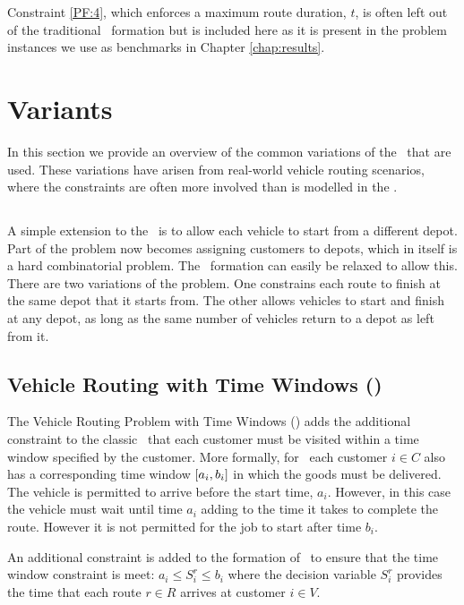 Constraint \eqref{PF:4}, which enforces a maximum route duration, $t$, is often left out of the traditional \CVRP\ formation but is included here as it is present in the problem instances we use as benchmarks in Chapter \ref{chap:results}.

\section{Variants}
\label{sec:variants}

In this section we provide an overview of the common variations of the \VRP\ that are used. These variations have arisen from real-world vehicle routing scenarios, where the constraints are often more involved than is modelled in the \CVRP. 

\subsection{\MDVRP}

A simple extension to the \CVRP\ is to allow each vehicle to start from a different depot. Part of the problem now becomes assigning customers to depots, which in itself is a hard combinatorial problem. The \CVRP\ formation can easily be relaxed to allow this. There are two variations of the problem. One constrains each route to finish at the same depot that it starts from. The other allows vehicles to start and finish at any depot, as long as the same number of vehicles return to a depot as left from it.

\subsection{Vehicle Routing with Time Windows (\VRPTW)}

The Vehicle Routing Problem with Time Windows (\VRPTW) adds the additional constraint to the classic \VRP\ that each customer must be visited within a time window specified by the customer. More formally, for \VRPTW\ each customer $i \in C$ also has a corresponding time window $[a_i, b_i]$ in which the goods must be delivered. The vehicle is permitted to arrive before the start time, $a_i$. However, in this case the vehicle must wait until time $a_i$ adding to the time it takes to complete the route. However it is not permitted for the job to start after time $b_i$.

An additional constraint is added to the formation of \CVRP\ to ensure that the time window constraint is meet: $a_i \leq S_i^r \leq b_i$ where the decision variable $S_i^r$ provides the time that each route $r \in R$ arrives at customer $i \in V$.  


